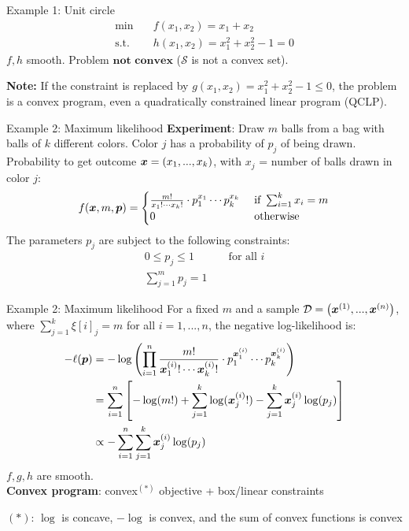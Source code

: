 \documentclass[11pt,compress,t,notes=noshow, xcolor=table]{beamer}
\begin{document}
\begin{framev}{Example 1: Unit circle}
$$
\begin{aligned}
\min \quad & f(x_1, x_2) = x_1 + x_2 \\
\text{s.t. } \quad & h(x_1,x_2) = x_1^2 + x_2^2 - 1 = 0
\end{aligned}
$$
$f, h$ smooth. Problem $\textbf{not convex}$ ($\mathcal{S}$ is not a convex set).\\
\spacer
\begin{footnotesize}
\textbf{Note: } If the constraint is replaced by $g(x_1, x_2) = x_1^2 + x_2^2 - 1 \le 0$, the problem is a convex program, even a quadratically constrained linear program (QCLP).
\end{footnotesize}
\end{framev}


\begin{framev}{Example 2: Maximum likelihood}
\textbf{Experiment}: Draw $m$ balls from a bag with balls of $k$ different colors.
Color $j$ has a probability of $p_j$ of being drawn.\\
\vfill
Probability to get outcome $\xv = (x_1, ..., x_k)$, with $x_j$ = number of balls drawn in color $j$:
$$
f(\xv, m, \bm{p}) = \begin{cases} \frac{m!}{x_1! \cdots x_k!} \cdot p_1^{x_1} \cdots p_k^{x_k} & \text{ if } \sum_{i = 1}^k x_i = m \\ 0 & \text{ otherwise}\end{cases}
$$
The parameters $p_j$ are subject to the following constraints:
$$
\begin{aligned}
0 \le p_j \le 1 && \text{ for all } i \\
\sum_{j = 1}^m p_j = 1 &&
\end{aligned}
$$
\end{framev}


\begin{framev}{Example 2: Maximum likelihood}
For a fixed $m$ and a sample $\D = \left(\xi[1], ..., \xi[n]\right)$, where $\sum_{j = 1}^k \xi[i]_j = m$ for all $i = 1, ..., n$, the negative log-likelihood is:
$$
\begin{aligned}
- \ell(\bm{p}) &= - \log \left(\prod_{i = 1}^n  \frac{m!}{\xi_1! \cdots \xi_k!} \cdot p_1^{\xi_1} \cdots p_k^{\xi_k}    \right) \\
&= \sumin \left[- \log(m!) + \sum_{j = 1}^k \log(\xi_j!) - \sum_{j = 1}^k \xi_j \log(p_j)\right] \\
&\propto - \sumin \sum_{j = 1}^k \xi_j \log(p_j)
\end{aligned}
$$
$f, g, h$ are smooth.\\\textbf{Convex program}: convex$^{(*)}$ objective + box/linear constraints
\vfill
\begin{footnotesize}
${(*)}$: $\log$ is concave, $- \log $ is convex, and the sum of convex functions is convex
\end{footnotesize}
\end{framev}
\end{document}
